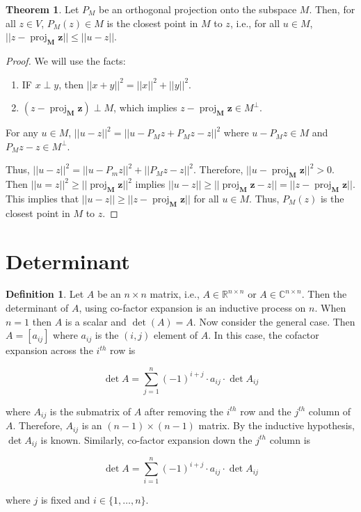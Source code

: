 \documentclass[12pt]{article}
\DeclareMathOperator{\proj}{proj}
\newcommand{\vct}{\mathbf}
\newcommand{\vctproj}[2][]{\proj_{\vct{#1}}\vct{#2}}
\theoremstyle{definition}
\newtheorem*{definition}{Definition}
\newtheorem{theorem}{Theorem}[section]  %
\begin{document}
\begin{theorem}
Let $P_M$ be an orthogonal projection onto the subspace $M$. Then, for all $z \in V$, 
$P_M(z) \in M$ is the closest point in $M$ to $z$, i.e., for all $u \in M$,
$|| z - \vctproj[M]{z} || \leq ||u - z||$.
\end{theorem}

\begin{proof}
We will use the facts:

\begin{enumerate}[label = (\arabic*)]
\item IF $x \perp y$, then $||x + y||^2 = ||x||^2 + ||y||^2$.
\item $(z - \vctproj[M]{z}) \perp M$, which implies $z - \vctproj[M]{z} \in M^{\perp}$.
\end{enumerate}

For any $u \in M$, $||u - z||^2 = ||u - P_M z + P_M z - z ||^2$ where
$u - P_M z \in M$ and $P_M z - z \in M^{\perp}$.

Thus, $||u - z||^2 = || u - P_m z ||^2 + ||P_M z - z ||^2$. Therefore, 
$||u - \vctproj[M]{z}||^2 > 0$. Then $||u = z ||^2 \geq ||\vctproj[M]{z}||^2$
implies $||u - z|| \geq ||\vctproj[M]{z} - z || = || z - \vctproj[M]{z} ||$.
This implies that $|| u - z || \geq ||z - \vctproj[M]{z}||$ for all $u \in M$.
Thus, $P_M (z)$ is the closest point in $M$ to $z$. 
\end{proof}

\section{Determinant}

\begin{definition}
Let $A$ be an $n \times n$ matrix, i.e., $A \in \mathbb{R}^{n \times n}$ or 
$A \in \mathbb{C}^{n \times n}$. Then the determinant of $A$, using co-factor
expansion is an inductive process on $n$. When $n = 1$ then $A$ is a scalar and
$\det(A) = A$. Now consider the general case. Then $A = [a_{ij}]$ where $a_{ij}$ is the
$(i, j)$ element of $A$. In this case, the cofactor expansion across the $i^{th}$ row is

\[ \det A = \sum_{j = 1}^n (-1)^{i + j} \cdot a_{ij} \cdot \det A_{ij} \]

where $A_{ij}$ is the submatrix of $A$ after removing the $i^{th}$ row and the $j^{th}$
column of $A$. Therefore, $A_{ij}$ is an $(n - 1) \times (n - 1)$ matrix. By the inductive
hypothesis, $\det A_{ij}$ is known. Similarly, co-factor expansion down the $j^{th}$
column is

\[ \det A = \sum_{i = 1}^n (-1)^{i + j} \cdot a_{ij} \cdot \det A_{ij}\]

where $j$ is fixed and $i \in \{1, \ldots, n\}$.
\end{definition}
\end{document}
